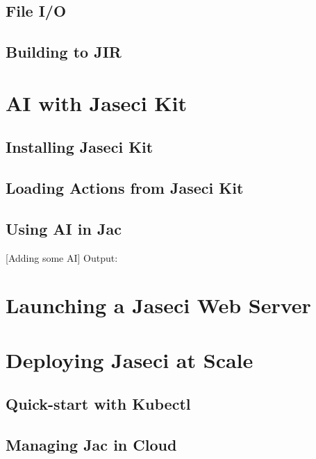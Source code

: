 \subsection{File I/O}


\subsection{Building to JIR}

\section{AI with Jaseci Kit}



\subsection{Installing Jaseci Kit}
\par
{}

\subsection{Loading Actions from Jaseci Kit}
\par
{}

\par
{}

\par
{}
\subsection{Using AI in Jac}
[Adding some AI]
Output:

\section{Launching a Jaseci Web Server}

\section{Deploying Jaseci at Scale}

\subsection{Quick-start with Kubectl}

\subsection{Managing Jac in Cloud}